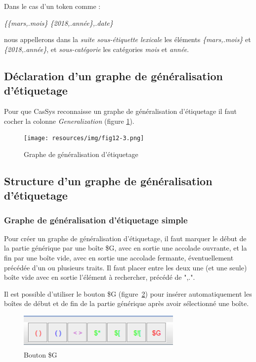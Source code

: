 Dans le cas d'un token comme :

\emph{\{\{mars,.mois\} \{2018,.année\},.date\}}

nous appellerons dans la \emph{suite sous-étiquette lexicale} les éléments \emph{\{mars,.mois\}} et \emph{\{2018,.année\}}, et \emph{sous-catégorie} les catégories \textit{mois} et \textit{année}.

\subsection{D\'{e}claration d'un graphe de g\'{e}n\'{e}ralisation d'\'{e}tiquetage}
Pour que CasSys reconnaisse un graphe de g\'{e}n\'{e}ralisation d'\'{e}tiquetage il faut cocher la colonne \emph{Generalization} (figure \ref{fig12-3}).
\begin{figure}[!htb]
  \centering
  \texttt{[image: resources/img/fig12-3.png]}
  \caption{Graphe de g\'{e}n\'{e}ralisation d'\'{e}tiquetage}
  \label{fig12-3}
\end{figure}

\subsection{Structure d'un graphe de g\'{e}n\'{e}ralisation d'\'{e}tiquetage}

\subsubsection{Graphe de généralisation d'étiquetage simple}

Pour créer un graphe de généralisation d'étiquetage, il faut marquer le début de la partie générique par une boîte \$G, avec en sortie une accolade ouvrante, et la fin par une boîte vide, avec en sortie une accolade fermante, éventuellement précédée d'un ou plusieurs traits. Il faut placer entre les deux une (et une seule) boîte vide avec en sortie l'élément à rechercher, précédé de ",.".

\bigskip
Il est possible d'utiliser le bouton \$G (figure~\ref{fig:bouton_g}) pour insérer automatiquement les boîtes de début et de fin de la partie générique après avoir sélectionné une boîte.

\begin{figure}[!htb]
  \centering
  \includegraphics[width=8cm]{resources/img/bouton_g.png}
  \caption{Bouton \$G}
  \label{fig:bouton_g}
\end{figure}

